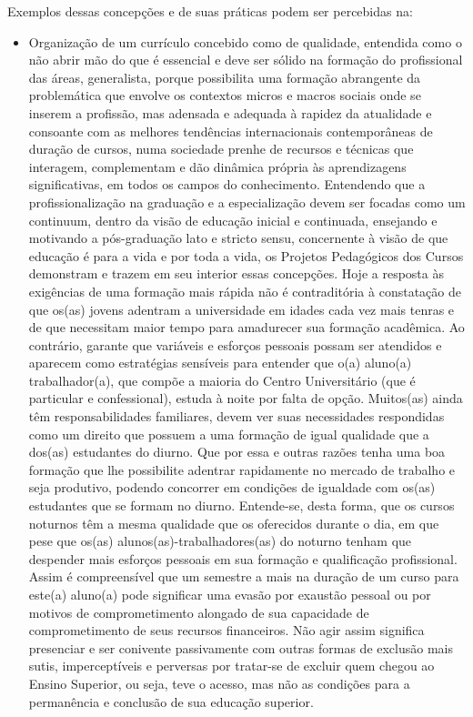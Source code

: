 \documentclass[a4paper, 12pt, openright, oneside, german, french, english, brazil]{abntex2}
\begin{document}
Exemplos dessas concepções e de suas práticas podem ser percebidas na:

\begin{itemize}
\item Organização de um currículo concebido como de qualidade, entendida como o não abrir mão do que é essencial e deve ser sólido na formação do profissional das áreas, generalista, porque possibilita uma formação abrangente da problemática que envolve os contextos micros e macros sociais onde se inserem a profissão, mas adensada e adequada à rapidez da atualidade e consoante com as melhores tendências internacionais contemporâneas de duração de cursos, numa sociedade prenhe de recursos e técnicas que interagem, complementam e dão dinâmica própria às aprendizagens significativas, em todos os campos do conhecimento. Entendendo que a profissionalização na graduação e a especialização devem ser focadas como um continuum, dentro da visão de educação inicial e continuada, ensejando e motivando a pós-graduação lato e stricto sensu, concernente à visão de que educação é para a vida e por toda a vida, os Projetos Pedagógicos dos Cursos demonstram e trazem em seu interior essas concepções. Hoje a resposta às exigências de uma formação mais rápida não é contraditória à constatação de que os(as) jovens adentram a universidade em idades cada vez mais tenras e de que necessitam maior tempo para amadurecer sua formação acadêmica. Ao contrário, garante que variáveis e esforços pessoais possam ser atendidos e aparecem como estratégias sensíveis para entender que o(a) aluno(a) trabalhador(a), que compõe a maioria do Centro Universitário (que é particular e confessional), estuda à noite por falta de opção. Muitos(as) ainda têm responsabilidades familiares, devem ver suas necessidades respondidas como um direito que possuem a uma formação de igual qualidade que a dos(as) estudantes do diurno. Que por essa e outras razões tenha uma boa formação que lhe possibilite adentrar rapidamente no mercado de trabalho e seja produtivo, podendo concorrer em condições de igualdade com os(as) estudantes que se formam no diurno. Entende-se, desta forma, que os cursos noturnos têm a mesma qualidade que os oferecidos durante o dia, em que pese que os(as) alunos(as)-trabalhadores(as) do noturno tenham que despender mais esforços pessoais em sua formação e qualificação profissional. Assim é compreensível que um semestre a mais na duração de um curso para este(a) aluno(a) pode significar uma evasão por exaustão pessoal ou por motivos de comprometimento alongado de sua capacidade de comprometimento de seus recursos financeiros. Não agir assim significa presenciar e ser conivente passivamente com outras formas de exclusão mais sutis, imperceptíveis e perversas por tratar-se de excluir quem chegou ao Ensino Superior, ou seja, teve o acesso, mas não as condições para a permanência e conclusão de sua educação superior.


\end{itemize}
\end{document}

